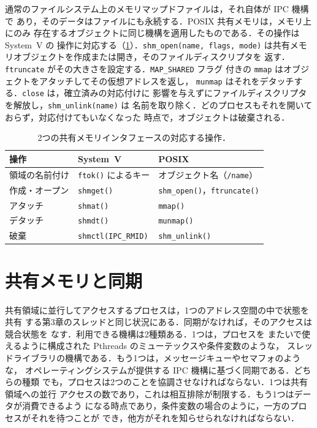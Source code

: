 \documentclass[../main.tex]{subfiles}
\begin{document}
通常のファイルシステム上のメモリマップドファイルは，それ自体が IPC 機構で
あり，そのデータはファイルにも永続する．POSIX 共有メモリは，メモリ上にのみ
存在するオブジェクトに同じ機構を適用したものである．その操作は System~V の
操作に対応する（\cref{tab:l09-shm-api}）．\texttt{shm\_open(name, flags,
mode)} は共有メモリオブジェクトを作成または開き，そのファイルディスクリプタを
返す．\texttt{ftruncate} がその大きさを設定する．\texttt{MAP\_SHARED} フラグ
付きの \texttt{mmap} はオブジェクトをアタッチしてその仮想アドレスを返し，
\texttt{munmap} はそれをデタッチする．\texttt{close} は，確立済みの対応付けに
影響を与えずにファイルディスクリプタを解放し，\texttt{shm\_unlink(name)} は
名前を取り除く．どのプロセスもそれを開いておらず，対応付けてもいなくなった
時点で，オブジェクトは破棄される．

\begin{table}[htbp]
  \centering
  \caption{2つの共有メモリインタフェースの対応する操作．}
  \label{tab:l09-shm-api}
  \small
  \begin{tabular}{@{}lll@{}}
    \toprule
    操作 & System~V & POSIX \\
    \midrule
    領域の名前付け & \texttt{ftok()} によるキー & オブジェクト名（\texttt{/name}） \\
    作成・オープン & \texttt{shmget()} & \texttt{shm\_open()}，\texttt{ftruncate()} \\
    アタッチ & \texttt{shmat()} & \texttt{mmap()} \\
    デタッチ & \texttt{shmdt()} & \texttt{munmap()} \\
    破棄 & \texttt{shmctl(IPC\_RMID)} & \texttt{shm\_unlink()} \\
    \bottomrule
  \end{tabular}
\end{table}

\section{共有メモリと同期}
\label{sec:l09-sync}

共有領域に並行してアクセスするプロセスは，1つのアドレス空間の中で状態を共有
する第3章のスレッドと同じ状況にある．同期がなければ，そのアクセスは競合状態を
なす．利用できる機構は2種類ある．1つは，プロセスを
またいで使えるように構成された Pthreads のミューテックスや条件変数のような，
スレッドライブラリの機構である．もう1つは，メッセージキューやセマフォのような，
オペレーティングシステムが提供する IPC 機構に基づく同期である．どちらの種類
でも，プロセスは2つのことを協調させなければならない．1つは共有領域への並行
アクセスの数であり，これは相互排除が制限する．もう1つはデータが消費できるよう
になる時点であり，条件変数の場合のように，一方のプロセスがそれを待つことが
でき，他方がそれを知らせられなければならない．
\end{document}
